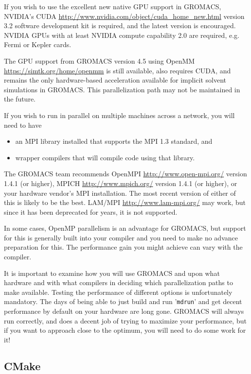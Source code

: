\documentclass{article}[12pt,a4paper,twoside]
\newcommand{\gromacs}{GROMACS}
\newcommand{\nvidia}{NVIDIA}
\newcommand{\cuda}{CUDA}
\newcommand{\mpi}{MPI}
\newcommand{\openmpi}{OpenMPI}
\newcommand{\openmp}{OpenMP}
\newcommand{\openmm}{OpenMM}
\newcommand{\lammpi}{LAM/MPI}
\newcommand{\mpich}{MPICH}
\newcommand{\cudaversion}{3.2}
\begin{document}
If you wish to use the excellent new native GPU support in \gromacs,
\nvidia{}'s \cuda{}
\url{http://www.nvidia.com/object/cuda_home_new.html} version
\cudaversion{} software development kit is required, and the latest
version is encouraged. \nvidia{} GPUs with at least \nvidia{} compute
capability 2.0 are required, e.g. Fermi or Kepler cards.

The GPU support from \gromacs{} version 4.5 using \openmm{}
\url{https://simtk.org/home/openmm} is still available, also requires
\cuda{}, and remains the only hardware-based acceleration available
for implicit solvent simulations in \gromacs{}. This parallelization
path may not be maintained in the future.

If you wish to run in parallel on multiple machines across a network,
you will need to have
\begin{itemize}
\item an \mpi{} library installed that supports the \mpi{} 1.3
  standard, and
\item wrapper compilers that will compile code using that library.
\end{itemize}
The \gromacs{} team recommends \openmpi{}
\url{http://www.open-mpi.org/} version 1.4.1 (or higher), \mpich{}
\url{http://www.mpich.org/} version 1.4.1 (or higher), or your
hardware vendor's \mpi{} installation. The most recent version of
either of this is likely to be the best. \lammpi{}
\url{http://www.lam-mpi.org/} may work, but since it has been
deprecated for years, it is not supported.

In some cases, \openmp{} parallelism is an advantage for \gromacs{},
but support for this is generally built into your compiler and you
need to make no advance preparation for this. The performance gain you
might achieve can vary with the compiler.

It is important to examine how you will use \gromacs{} and upon what
hardware and with what compilers in deciding which parallelization
paths to make available. Testing the performance of different options
is unfortunately mandatory. The days of being able to just build and
run '\verb+mdrun+' and get decent performance by default on your
hardware are long gone. \gromacs{} will always run correctly, and does
a decent job of trying to maximize your performance, but if you want
to approach close to the optimum, you will need to do some work for
it!

\subsection{CMake}
\end{document}
